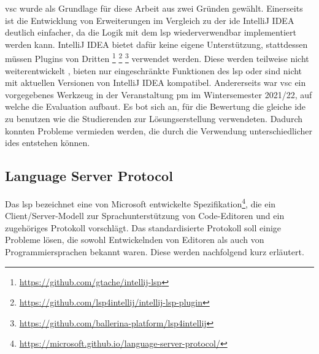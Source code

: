 \ac{vsc} wurde als Grundlage für diese Arbeit aus zwei Gründen gewählt.
Einerseits ist die Entwicklung von Erweiterungen im Vergleich zu der \ac{ide} IntelliJ IDEA deutlich einfacher, da die Logik mit dem \ac{lsp} wiederverwendbar implementiert werden kann.
IntelliJ IDEA bietet dafür keine eigene Unterstützung, stattdessen müssen Plugins von Dritten
\footnote{\url{https://github.com/gtache/intellij-lsp}\label{fn:intellij-lsp}}
\footnote{\url{https://github.com/lsp4intellij/intellij-lsp-plugin}\label{fn:intellij-lsp-plugin}}
\footnote{\url{https://github.com/ballerina-platform/lsp4intellij}\label{fn:lsp4intellij}}
verwendet werden.
Diese werden teilweise nicht weiterentwickelt , bieten nur eingeschränkte Funktionen des \ac{lsp} oder sind nicht mit aktuellen Versionen von IntelliJ IDEA kompatibel.
Andererseits war \ac{vsc} ein vorgegebenes Werkzeug in der Veranstaltung \ac{pm} im Wintersemester 2021/22, auf welche die Evaluation aufbaut.
Es bot sich an, für die Bewertung die gleiche \ac{ide} zu benutzen wie die Studierenden zur Lösungserstellung verwendeten.
Dadurch konnten Probleme vermieden werden, die durch die Verwendung unterschiedlicher \acp{ide} entstehen können. %

\subsection{Language Server Protocol}\label{subsec:language-server-protocol}

Das \ac{lsp} bezeichnet eine von Microsoft entwickelte Spezifikation\footnote{\url{https://microsoft.github.io/language-server-protocol/}}, die ein Client/Server-Modell zur Sprachunterstützung von Code-Editoren und ein zugehöriges Protokoll vorschlägt.
Das standardisierte Protokoll soll einige Probleme lösen, die sowohl Entwickelnden von Editoren als auch von Programmiersprachen bekannt waren.
Diese werden nachfolgend kurz erläutert.

